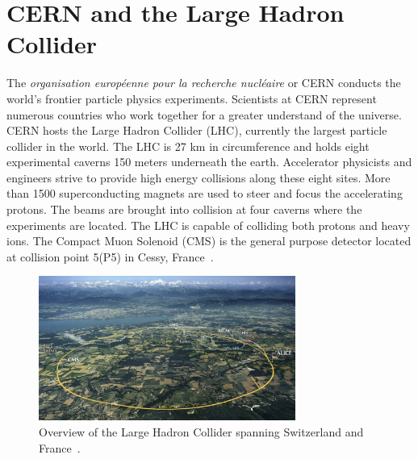 \section{CERN and the Large Hadron Collider}
The \textit{organisation européenne pour la recherche nucléaire} or CERN conducts the world's frontier particle physics experiments. 
Scientists at CERN represent numerous countries who work together for a greater understand of the universe. 
CERN hosts the Large Hadron Collider (LHC), currently the largest particle collider in the world. The LHC is 27 km in circumference and holds eight experimental caverns 150 meters underneath the earth. Accelerator physicists and engineers strive to provide high energy collisions along these eight sites. More than 1500 superconducting magnets are used to steer and focus the accelerating protons. 
The beams are brought into collision at four caverns where the experiments are located.
The LHC is capable of colliding both protons and heavy ions. 
The Compact Muon Solenoid (CMS) is the general purpose detector located at collision point 5(P5) in Cessy, France~\cite{Bruning:782076}. 

\begin{figure}[ht!b]
\label{fig:lhc}
  \centering
\includegraphics[width=0.75\textwidth]{figures/LHC_map-s.jpg}    
    \caption{Overview of the Large Hadron Collider spanning Switzerland and France~\cite{25yrLHC}.}
\end{figure}

